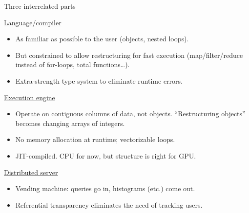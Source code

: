 \documentclass{beamer}
\begin{document}
\begin{frame}{Three interrelated parts}
\vspace{0.15 cm}
\begin{block}{\underline{Language/compiler}}
\vspace{-0.1 cm}
\begin{itemize}
\item As familiar as possible to the user (objects, nested loops).
\item But constrained to allow restructuring for fast execution (map/filter/reduce instead of for-loops, total functions\ldots).
\item Extra-strength type system to eliminate runtime errors.
\end{itemize}
\end{block}

\vspace{-0.2 cm}
\begin{block}{\underline{Execution engine}}
\vspace{-0.1 cm}
\begin{itemize}
\item Operate on contiguous columns of data, not objects. ``Restructuring objects'' becomes changing arrays of integers.
\item No memory allocation at runtime; vectorizable loops.
\item JIT-compiled. CPU for now, but structure is right for GPU.
\end{itemize}
\end{block}

\vspace{-0.2 cm}
\begin{block}{\underline{Distributed server}}
\vspace{-0.1 cm}
\begin{itemize}
\item Vending machine: queries go in, histograms (etc.) come out.
\item Referential transparency eliminates the need of tracking users.
\end{itemize}
\end{block}
\end{frame}
\end{document}
